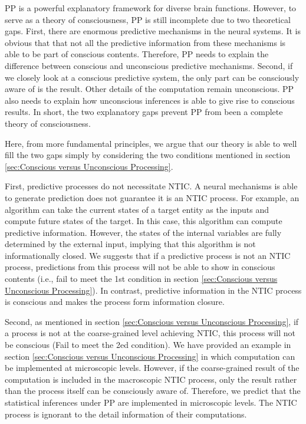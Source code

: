 \documentclass[utf8]{article}
\begin{document}
    		
    		PP is a powerful explanatory framework for diverse brain functions. However, to serve as a theory of consciousness, PP is still incomplete due to two theoretical gaps. First, there are enormous predictive mechanisms in the neural systems. It is  obvious that that not all the predictive information from these mechanisms is able to be part of conscious contents. Therefore, PP needs to explain the difference between conscious and unconscious predictive mechanisms. Second, if we closely look at a conscious predictive system, the only part can be consciously aware of is the result. Other details of the computation remain unconscious. PP also needs to explain how unconscious inferences is able to give rise to conscious results. In short, the two explanatory gaps prevent PP from been a complete theory of consciousness. 
    		
    		Here, from more fundamental principles, we  argue that our theory is able to well fill the two gaps simply by considering the two conditions mentioned in section \ref{sec:Conscious versus Unconscious Processing}.
    		
    		First, predictive processes do not necessitate NTIC. A neural mechanisms is able to generate prediction does not guarantee it is an NTIC process. For example, an algorithm can take the current states of a target entity as the inputs and compute future states of the target. In this case, this algorithm can compute predictive information. However, the states of the internal variables are fully determined by the external input, implying that this algorithm is not informationally closed. We suggests that if a predictive process is not an NTIC process, predictions from this process will not be able to show in conscious contents (i.e., fail to meet the 1\lowercase{st} condition in section \ref{sec:Conscious versus Unconscious Processing}). In contrast, predictive information in the NTIC process is conscious and makes the process form information closure. 
    		
    		Second, as mentioned in section \ref{sec:Conscious versus Unconscious Processing}, if a process is not at the coarse-grained level achieving NTIC, this process will not be conscious (Fail to meet the 2\lowercase{ed} condition). We have provided an example in section \ref{sec:Conscious versus Unconscious Processing} in which computation can be implemented at microscopic levels. However, if the coarse-grained result of the computation is included in the macroscopic NTIC process, only the result rather than the process itself can be consciously aware of. Therefore, we predict that the statistical inferences under PP are implemented in microscopic levels. The NTIC process is ignorant to the detail information of their computations. 
    
\end{document}

